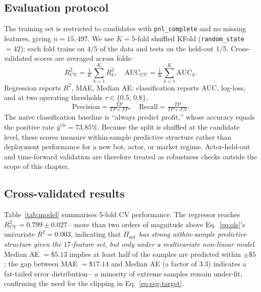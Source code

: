 \documentclass[sigconf,nonacm,10pt]{acmart}
\newcommand{\Pnet}{\Pi_{\text{net}}}
\begin{document}
\subsection{Evaluation protocol}

The training set is restricted to candidates with
\texttt{pnl\_complete} and no missing features, giving $n=15{,}497$.
We use $K=5$-fold shuffled KFold (\texttt{random\_state}$=42$):
each fold trains on $4/5$ of the data and tests on the held-out
$1/5$. Cross-validated scores are averaged across folds:
\begin{equation}
R^2_{\text{CV}} = \tfrac{1}{K}\sum_{k=1}^{K} R^2_k,\quad
\text{AUC}_{\text{CV}} = \tfrac{1}{K}\sum_{k=1}^{K} \text{AUC}_k.
\label{eq:cv}
\end{equation}
Regression reports $R^2$, MAE, Median AE; classification reports
AUC, log-loss, and at two operating thresholds
$\tau\in\{0.5,\,0.8\}$,
\begin{equation}
\text{Precision}=\tfrac{TP}{TP+FP},\quad
\text{Recall}=\tfrac{TP}{TP+FN}.
\label{eq:pr}
\end{equation}
The naive classification baseline is ``always predict profit,''
whose accuracy equals the positive rate
$\bar y^{\text{cls}}=73.85\%$.
Because the split is shuffled at the candidate level, these scores
measure within-sample predictive structure rather than deployment
performance for a new bot, actor, or market regime. Actor-held-out
and time-forward validation are therefore treated as robustness checks
outside the scope of this chapter.

\subsection{Cross-validated results}

Table~\ref{tab:model} summarises 5-fold CV performance. The regressor
reaches $R^2_{\text{CV}}=0.799\pm 0.027$---more than two orders of
magnitude above Eq.~\eqref{eq:ols}'s univariate $R^2=0.003$,
indicating that \emph{$\Pnet$ has strong within-sample predictive
structure given the $17$-feature set, but only under a multivariate
non-linear model}. Median AE $=\$5.13$
implies at least half of the samples are predicted within $\pm\$5$;
the gap between MAE $=\$17.14$ and Median AE (a factor of $3.3$)
indicates a fat-tailed error distribution---a minority of extreme
samples remain under-fit, confirming the need for the clipping in
Eq.~\eqref{eq:reg-target}.
\end{document}
